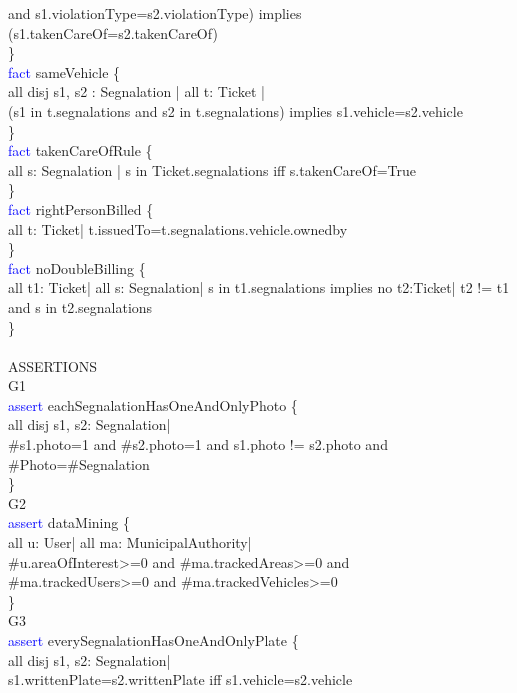 and s1.violationType=s2.violationType) implies\\ (s1.takenCareOf=s2.takenCareOf)\\
\}\\
\textcolor{blue}{fact}
\textcolor{mycolor}{sameVehicle} \{\\
all disj s1, s2 : Segnalation | all t: Ticket |\\
(s1 in t.segnalations and s2 in t.segnalations) implies s1.vehicle=s2.vehicle\\
\}\\
\textcolor{blue}{fact}
\textcolor{mycolor}{takenCareOfRule} \{\\
all s: Segnalation |
s in Ticket.segnalations iff s.takenCareOf=True\\
\}\\
\textcolor{blue}{fact}
\textcolor{mycolor}{rightPersonBilled} \{\\
all t: Ticket| t.issuedTo=t.segnalations.vehicle.ownedby\\
\}\\
\textcolor{blue}{fact}
\textcolor{mycolor}{noDoubleBilling} \{\\
all t1: Ticket| all s: Segnalation|
s in t1.segnalations implies no t2:Ticket| t2 != t1 and s in t2.segnalations\\
\}\\
\\
ASSERTIONS\\
G1\\
\textcolor{blue}{assert}
\textcolor{mycolor}{eachSegnalationHasOneAndOnlyPhoto} \{\\
all disj s1, s2: Segnalation|\\ 
\#s1.photo=1 and \#s2.photo=1 and s1.photo != s2.photo
and \#Photo=\#Segnalation\\
\}\\
G2\\
\textcolor{blue}{assert}
\textcolor{mycolor}{dataMining} \{\\
all u: User| all ma: MunicipalAuthority|\\
\#u.areaOfInterest>=0 and \#ma.trackedAreas>=0 and\\ \#ma.trackedUsers>=0 and \#ma.trackedVehicles>=0\\
\}\\
G3\\
\textcolor{blue}{assert}
\textcolor{mycolor}{everySegnalationHasOneAndOnlyPlate} \{\\
    all disj s1, s2: Segnalation|\\
s1.writtenPlate=s2.writtenPlate iff s1.vehicle=s2.vehicle\\
